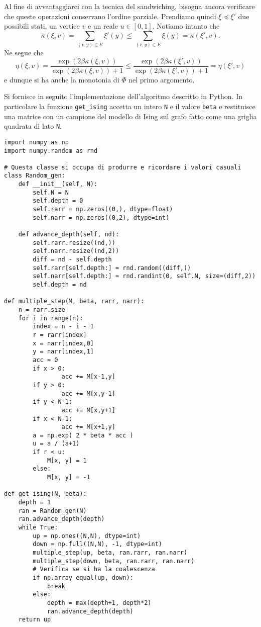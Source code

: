 \documentclass[]{marticle}
\begin{document}
Al fine di avvantaggiarci con la tecnica del sandwiching, bisogna ancora
verificare che queste operazioni conservano l'ordine parziale. Prendiamo quindi
$\xi \preceq \xi'$ due possibili stati, un vertice $v$ e un reale $u\in[0,1]$.
Notiamo intanto che
\[
    \kappa(\xi,v) = \sum_{(v,y)\in E} \xi'(y) \leq
    \sum_{(v,y)\in E} \xi(y) = \kappa(\xi', v).
\]
Ne segue che 
\[
    \eta(\xi,v) = \frac{\exp(2\beta\kappa(\xi,v))}{\exp(2\beta\kappa(\xi,v))+1}
    \leq \frac{\exp(2\beta\kappa(\xi',v))}{\exp(2\beta\kappa(\xi',v))+1}
    = \eta(\xi',v)
\]
e dunque si ha anche la monotonia di $\Phi$ nel primo argomento.

Si fornisce in seguito l'implementazione dell'algoritmo descritto in Python. In
particolare la funzione \texttt{get\_ising} accetta un intero \texttt{N} e il
valore \texttt{beta} e restituisce una matrice con un campione del modello di
Ising sul grafo fatto come una griglia quadrata di lato \texttt{N}. 

\begin{lstlisting}
import numpy as np
import numpy.random as rnd

# Questa classe si occupa di produrre e ricordare i valori casuali
class Random_gen:
    def __init__(self, N):
        self.N = N
        self.depth = 0
        self.rarr = np.zeros((0,), dtype=float)
        self.narr = np.zeros((0,2), dtype=int)

    def advance_depth(self, nd):
        self.rarr.resize((nd,))
        self.narr.resize((nd,2))
        diff = nd - self.depth
        self.rarr[self.depth:] = rnd.random((diff,))
        self.narr[self.depth:] = rnd.randint(0, self.N, size=(diff,2))
        self.depth = nd

def multiple_step(M, beta, rarr, narr):
    n = rarr.size
    for i in range(n):
        index = n - i - 1
        r = rarr[index]
        x = narr[index,0]
        y = narr[index,1]
        acc = 0
        if x > 0:
                acc += M[x-1,y]
        if y > 0:
                acc += M[x,y-1]
        if y < N-1:
                acc += M[x,y+1]
        if x < N-1:
                acc += M[x+1,y]
        a = np.exp( 2 * beta * acc )
        u = a / (a+1)
        if r < u:
            M[x, y] = 1
        else:
            M[x, y] = -1

def get_ising(N, beta):
    depth = 1
    ran = Random_gen(N)
    ran.advance_depth(depth)
    while True:
        up = np.ones((N,N), dtype=int)
        down = np.full((N,N), -1, dtype=int)
        multiple_step(up, beta, ran.rarr, ran.narr)
        multiple_step(down, beta, ran.rarr, ran.narr)
        # Verifica se si ha la coalescenza
        if np.array_equal(up, down): 
            break
        else:
            depth = max(depth+1, depth*2)
            ran.advance_depth(depth)
    return up
\end{lstlisting}
\end{document}

